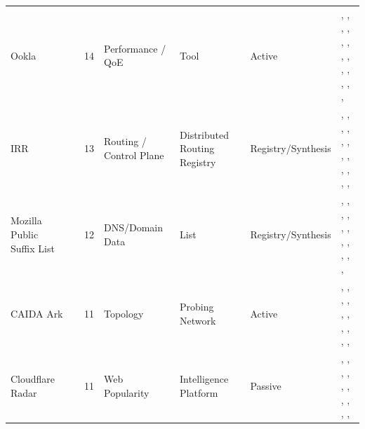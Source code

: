 \begin{table}[h!]
\begin{tabular}{lllllll}
Ookla & \cite{ooklaspeedtest} & 14 & Performance / QoE & Tool & Active & \cite{10.1145/3730567.3732914}, \cite{10.1145/3730567.3764491}, \cite{10.1145/3646547.3689007}, \cite{10.1145/3646547.3688441}, \cite{10.1145/3517745.3561416}, \cite{10.1145/3517745.3561441}, \cite{10.1145/3487552.3487862}, \cite{10.1007/978-3-030-98785-5_4}, \cite{10.1007/978-3-030-98785-5_6}, \cite{10.1007/978-3-031-28486-1_1}, \cite{10.1007/978-3-031-28486-1_13}, \cite{10.1007/978-3-031-85960-1_20}, \cite{10.1145/3777912.3839816}, \cite{10.1145/3777912.3809140} \\
IRR & \cite{irr} & 13 & Routing / Control Plane & Distributed Routing Registry & Registry/Synthesis & \cite{10.1145/3730567.3732924}, \cite{10.1145/3646547.3688414}, \cite{10.1145/3646547.3689018}, \cite{10.1145/3646547.3688444}, \cite{10.1145/3618257.3624838}, \cite{10.1145/3618257.3624819}, \cite{10.1145/3618257.3624812}, \cite{10.1145/3517745.3561419}, \cite{10.1145/3517745.3561454}, \cite{10.1007/978-3-030-98785-5_14}, \cite{10.1007/978-3-032-18268-5_2}, \cite{10.1145/3777912.3809137}, \cite{10.1145/3777912.3809149} \\
Mozilla Public Suffix List & \cite{mozillapsl} & 12 & DNS/Domain Data & List & Registry/Synthesis & \cite{10.1145/3730567.3764501}, \cite{10.1145/3618257.3624836}, \cite{10.1145/3618257.3624797}, \cite{10.1145/3517745.3561418}, \cite{10.1145/3517745.3561444}, \cite{10.1145/3487552.3487820}, \cite{10.1007/978-3-031-28486-1_21}, \cite{10.1007/978-3-031-28486-1_22}, \cite{10.1007/978-3-031-28486-1_26}, \cite{10.1007/978-3-031-56249-5_10}, \cite{10.1145/3777912.3839832}, \cite{10.1145/3777912.3839791} \\
CAIDA Ark & \cite{caidaark} & 11 & Topology & Probing Network & Active & \cite{10.1145/3730567.3764457}, \cite{10.1145/3646547.3688429}, \cite{10.1145/3517745.3561440}, \cite{10.1007/978-3-030-72582-2_14}, \cite{10.1007/978-3-030-98785-5_7}, \cite{10.1007/978-3-030-98785-5_20}, \cite{10.1007/978-3-031-28486-1_16}, \cite{10.1145/3777912.3839832}, \cite{10.1145/3777912.3809137}, \cite{10.1145/3777912.3839804}, \cite{10.1145/3777912.3809149} \\
Cloudflare Radar & \cite{cloudflareradar} & 11 & Web Popularity & Intelligence Platform & Passive & \cite{10.1145/3730567.3764501}, \cite{10.1145/3646547.3688449}, \cite{10.1145/3646547.3688444}, \cite{10.1007/978-3-031-85960-1_3}, \cite{10.1007/978-3-031-85960-1_5}, \cite{10.1007/978-3-031-85960-1_13}, \cite{10.1007/978-3-032-18268-5_1}, \cite{10.1145/3777912.3839809}, \cite{10.1145/3777912.3839801}, \cite{10.1145/3777912.3839807}, \cite{10.1145/3777912.3839812} \\

\end{tabular}
\end{table}
